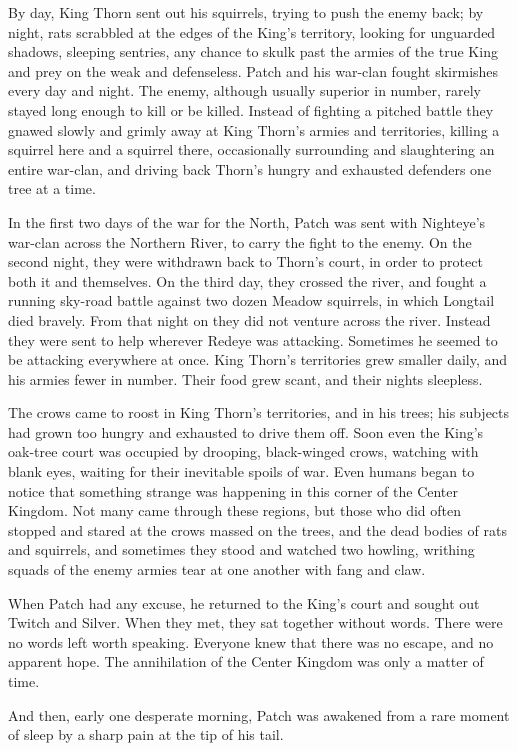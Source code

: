 \documentclass[ebook,oneside,openany,12pt]{memoir}
\begin{document}
By day, King Thorn sent out his squirrels, trying to push the enemy
back; by night, rats scrabbled at the edges of the King’s territory,
looking for unguarded shadows, sleeping sentries, any chance to skulk
past the armies of the true King and prey on the weak and
defenseless. Patch and his war-clan fought skirmishes every day and
night. The enemy, although usually superior in number, rarely stayed
long enough to kill or be killed. Instead of fighting a pitched battle
they gnawed slowly and grimly away at King Thorn’s armies and
territories, killing a squirrel here and a squirrel there,
occasionally surrounding and slaughtering an entire war-clan, and
driving back Thorn’s hungry and exhausted defenders one tree at a
time.

In the first two days of the war for the North, Patch was sent with
Nighteye’s war-clan across the Northern River, to carry the fight to
the enemy. On the second night, they were withdrawn back to Thorn’s
court, in order to protect both it and themselves. On the third day,
they crossed the river, and fought a running sky-road battle against
two dozen Meadow squirrels, in which Longtail died bravely. From that
night on they did not venture across the river. Instead they were sent
to help wherever Redeye was attacking. Sometimes he seemed to be
attacking everywhere at once. King Thorn’s territories grew smaller
daily, and his armies fewer in number. Their food grew scant, and
their nights sleepless.

The crows came to roost in King Thorn’s territories, and in his trees;
his subjects had grown too hungry and exhausted to drive them
off. Soon even the King’s oak-tree court was occupied by drooping,
black-winged crows, watching with blank eyes, waiting for their
inevitable spoils of war. Even humans began to notice that something
strange was happening in this corner of the Center Kingdom. Not many
came through these regions, but those who did often stopped and stared
at the crows massed on the trees, and the dead bodies of rats and
squirrels, and sometimes they stood and watched two howling, writhing
squads of the enemy armies tear at one another with fang and claw.

When Patch had any excuse, he returned to the King’s court and sought
out Twitch and Silver. When they met, they sat together without
words. There were no words left worth speaking. Everyone knew that
there was no escape, and no apparent hope. The annihilation of the
Center Kingdom was only a matter of time.

And then, early one desperate morning, Patch was awakened from a rare
moment of sleep by a sharp pain at the tip of his tail.
\end{document}
